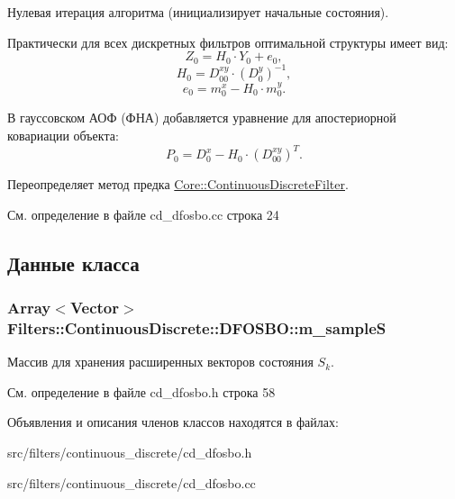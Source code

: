 Нулевая итерация алгоритма (инициализирует начальные состояния). 

Практически для всех дискретных фильтров оптимальной структуры имеет вид\+: \[Z_0 = H_0 \cdot Y_0 + e_0,\] \[H_0 = D_{00}^{xy} \cdot (D_0^y)^{-1},\] \[e_0 = m_0^x - H_0 \cdot m_0^y.\]

В гауссовском АОФ (ФНА) добавляется уравнение для апостериорной ковариации объекта\+: \[P_0 = D_0^x - H_0 \cdot (D_{00}^{xy})^T.\] 

Переопределяет метод предка \hyperlink{class_core_1_1_continuous_discrete_filter_acc9b18241a13d46dc92ef1f02ec13e53}{Core\+::\+Continuous\+Discrete\+Filter}.



См. определение в файле cd\+\_\+dfosbo.\+cc строка 24



\subsection{Данные класса}
\subsubsection[{\texorpdfstring{m\+\_\+sampleS}{m_sampleS}}]{\setlength{\rightskip}{0pt plus 5cm}Array$<$Vector$>$ Filters\+::\+Continuous\+Discrete\+::\+D\+F\+O\+S\+B\+O\+::m\+\_\+sampleS\hspace{0.3cm}{\ttfamily [protected]}}\hypertarget{class_filters_1_1_continuous_discrete_1_1_d_f_o_s_b_o_affccb91872f23878db490d487c481606}{}\label{class_filters_1_1_continuous_discrete_1_1_d_f_o_s_b_o_affccb91872f23878db490d487c481606}
Массив для хранения расширенных векторов состояния $S_k$. 

См. определение в файле cd\+\_\+dfosbo.\+h строка 58



Объявления и описания членов классов находятся в файлах\+:\begin{DoxyCompactItemize}
\item 
src/filters/continuous\+\_\+discrete/cd\+\_\+dfosbo.\+h\item 
src/filters/continuous\+\_\+discrete/cd\+\_\+dfosbo.\+cc\end{DoxyCompactItemize}
